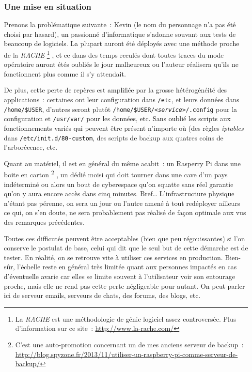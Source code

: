 \subsubsection{Une mise en situation}

Prenons la problématique suivante~:
Kevin (le nom du personnage n'a pas été choisi par hasard), un passionné d'informatique s'adonne souvant aux tests de beaucoup de logiciels.
La plupart auront été déployés avec une méthode proche de la \emph{RACHE}%
\footnote{La \emph{RACHE} est une méthodologie de génie logiciel assez controversée. Plus d'information sur ce site~: \url{http://www.la-rache.com/}}%
, et ce dans des temps reculés dont toutes traces du mode opératoire auront étés oubliés le jour malheureux ou l'auteur réalisera qu'ils ne fonctionnent plus comme il s'y attendait.

De plus, cette perte de repères est amplifiée par la grosse hétérogénéité des applications~: certaines ont leur configuration dans {\tt/etc}, et leurs données dans {\tt/home/\$USER}, d'autres seront plutôt {\tt/home/\$USER/\emph{<service>}/.config} pour la configuration et {\tt/usr/var/} pour les données, etc.
Sans oublié les scripts aux fonctionnements variés qui peuvent être présent n'importe où (des règles \emph{iptables} dans {\tt/etc/init.d/80-custom}, des scripts de backup aux quatres coins de l'arborécence, etc.

Quant au matériel, il est en général du même acabit~: un Rasperry Pi dans une boite en carton%
\footnote{C'est une auto-promotion concernant un de mes anciens serveur de backup~: \url{http://blog.spyzone.fr/2013/11/utiliser-un-raspberry-pi-comme-serveur-de-backup/}}%
, un dédié moisi qui doit tourner dans une cave d'un pays indéterminé ou alors un bout de cyberespace qu'on squatte sans réel garantie qu'on y aura encore accès dans cinq minutes.
Bref\dots{} L'infrastructure physique n'étant pas pérenne, on sera un jour ou l'autre amené à tout redéployer ailleurs ce qui, on s'en doute, ne sera probablement pas réalisé de façon optimale aux vus des remarques précédentes.

Toutes ces difficutés peuvent être acceptables (bien que peu régouissantes) si l'on conserve le postulat de base, celui qui dit que le seul but de cette démarche est de tester.
En réalité, on se retrouve vite à utiliser ces services en production.
Bien-sûr, l'échelle reste en général très limitée quant aux personnes impactés en cas d'éventuelle avarie car elles se limite souvent à l'utilisateur voir son entourage proche, mais elle ne rend pas cette perte négligeable pour autant.
On peut parler ici de serveur emails, serveurs de chats, des forums, des blogs, etc.

